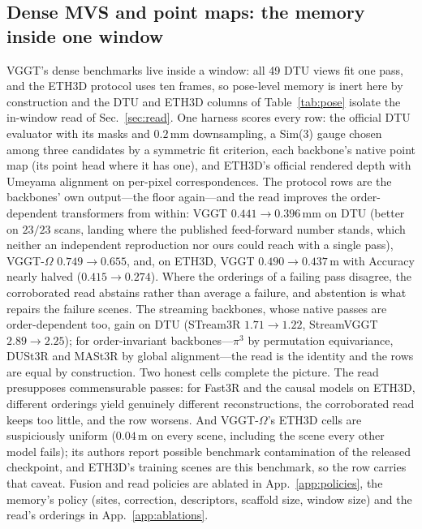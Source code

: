 \documentclass{article}
\begin{document}
\subsection{Dense MVS and point maps: the memory inside one window}
\label{sec:mvs}
VGGT's dense benchmarks live inside a window: all 49 DTU views fit one pass,
and the ETH3D protocol uses ten frames, so pose-level memory is inert here by
construction and the DTU and ETH3D columns of Table~\ref{tab:pose} isolate
the in-window read of Sec.~\ref{sec:read}. One harness scores every row: the
official DTU evaluator with its masks and $0.2$\,mm downsampling, a Sim(3)
gauge chosen among three candidates by a symmetric fit criterion, each
backbone's native point map (its point head where it has one), and ETH3D's
official rendered depth with Umeyama alignment on per-pixel correspondences.
The protocol rows are the backbones' own output---the floor again---and the
read improves the order-dependent transformers from within: VGGT
$0.441\!\to\!0.396$\,mm on DTU (better on $23/23$ scans, landing where the
published feed-forward number stands, which neither an independent
reproduction \citep{langendoerfer2026vggt} nor ours could reach with a single
pass), VGGT-$\Omega$ $0.749\!\to\!0.655$, and, on ETH3D, VGGT
$0.490\!\to\!0.437$\,m with Accuracy nearly halved ($0.415\!\to\!0.274$). Where the orderings of a failing pass disagree, the corroborated read abstains
rather than average a failure, and abstention is what repairs the failure
scenes. The streaming
backbones, whose native passes are order-dependent too, gain on DTU
(STream3R $1.71\!\to\!1.22$, StreamVGGT $2.89\!\to\!2.25$); for
order-invariant backbones---$\pi^3$ by permutation equivariance, DUSt3R and
MASt3R by global alignment---the read is the identity and the rows are equal
by construction. Two honest cells complete the picture. The read presupposes
commensurable passes: for Fast3R and the causal models on ETH3D, different
orderings yield genuinely different reconstructions, the corroborated read
keeps too little, and the row worsens. And VGGT-$\Omega$'s ETH3D cells are
suspiciously uniform ($0.04$\,m on every scene, including the scene every
other model fails); its authors report possible benchmark contamination of
the released checkpoint, and ETH3D's training scenes are this benchmark, so
the row carries that caveat. Fusion and read policies are ablated in
App.~\ref{app:policies}, the memory's policy (sites, correction, descriptors,
scaffold size, window size) and the read's orderings in App.~\ref{app:ablations}.
\end{document}
